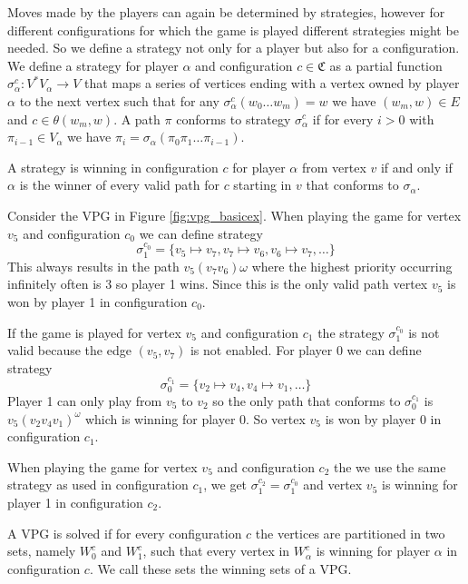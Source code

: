 Moves made by the players can again be determined by strategies, however for different configurations for which the game is played different strategies might be needed. So we define a strategy not only for a player but also for a configuration. We define a strategy for player $\alpha$ and configuration $c \in \mathfrak{C}$ as a partial function $\sigma_\alpha^c : V^*V_\alpha \rightarrow V$ that maps a series of vertices ending with a vertex owned by player $\alpha$ to the next vertex such that for any $\sigma_\alpha^c(w_0\dots w_m) = w$ we have $(w_m,w) \in E$ and $c \in \theta(w_m,w)$. A path $\pi$ conforms to strategy $\sigma_\alpha^c$ if for every $i > 0$ with $\pi_{i-1}\in V_\alpha$ we have $\pi_i = \sigma_\alpha(\pi_0\pi_1\dots\pi_{i-1})$.

A strategy is winning in configuration $c$ for player $\alpha$ from vertex $v$ if and only if $\alpha$ is the winner of every valid path for $c$ starting in $v$ that conforms to $\sigma_\alpha$.

\begin{example}
	Consider the VPG in Figure \ref{fig:vpg_basicex}. When playing the game for vertex $v_5$ and configuration $c_0$ we can define strategy 
	\[ \sigma_1^{c_0} = \{ v_5 \mapsto v_7, v_7\mapsto v_6,v_6\mapsto v_7, \dots \}\]
	This always results in the path $v_5(v_7v_6)\omega$ where the highest priority occurring infinitely often is 3 so player 1 wins. Since this is the only valid path vertex $v_5$ is won by player 1 in configuration $c_0$.
	
	If the game is played for vertex $v_5$ and configuration $c_1$ the strategy $\sigma_1^{c_0}$ is not valid because the edge $(v_5,v_7)$ is not enabled. For player $0$ we can define strategy
	\[ \sigma_0^{c_1} = \{ v_2 \mapsto v_4, v_4 \mapsto v_1,\dots\}\]
	Player 1 can only play from $v_5$ to $v_2$ so the only path that conforms to $\sigma_0^{c_1}$ is $v_5(v_2v_4v_1)^\omega$ which is winning for player 0. So vertex $v_5$ is won by player 0 in configuration $c_1$.
	
	When playing the game for vertex $v_5$ and configuration $c_2$ the we use the same strategy as used in configuration $c_1$, we get $\sigma_1^{c_2} = \sigma_1^{c_0}$ and vertex $v_5$ is winning for player 1 in configuration $c_2$.
\end{example}

A VPG is solved if for every configuration $c$ the vertices are partitioned in two sets, namely $W_0^c$ and $W_1^c$, such that every vertex in $W_\alpha^c$ is winning for player $\alpha$ in configuration $c$. We call these sets the winning sets of a VPG.

